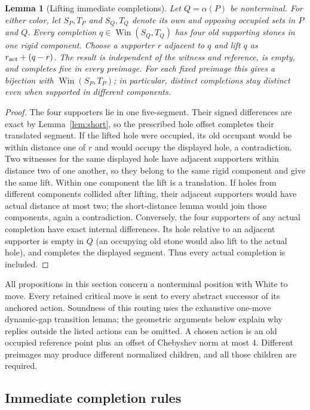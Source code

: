 \documentclass[11pt]{article}
\newtheorem{lemma}[theorem]{Lemma}
\theoremstyle{definition}
\theoremstyle{remark}
\newcommand{\A}{\alpha}
\newcommand{\Win}{\operatorname{Win}}
\begin{document}
\begin{lemma}[Lifting immediate completions]\label{mac:completion-lift}
Let $Q=\A(P)$ be nonterminal. For either color, let $S_P,T_P$
and $S_Q,T_Q$ denote its own and opposing occupied sets in $P$ and $Q$.
Every completion
$q\in\Win(S_Q,T_Q)$ has four old supporting stones in one rigid
component. Choose a supporter $r$ adjacent to $q$ and lift $q$ as
$r_{\rm act}+(q-r)$. The result is independent of the witness and
reference, is empty, and completes five in every preimage. For each
fixed preimage this gives a bijection with $\Win(S_P,T_P)$; in
particular, distinct completions stay distinct even when supported
in different components.
\end{lemma}
\begin{proof}
The four supporters lie in one five-segment. Their signed differences
are exact by Lemma~\ref{lem:short}, so the prescribed hole offset
completes their translated segment.
If the lifted hole were occupied, its old occupant would be within
distance one of $r$ and would occupy the displayed hole, a
contradiction. Two witnesses for the same displayed hole have
adjacent supporters within distance two of one another, so they
belong to the same rigid component and give the same lift.
Within one component the lift is a translation. If holes from
different components collided after lifting, their adjacent
supporters would have actual distance at most two; the short-distance
lemma would join those components, again a contradiction.
Conversely, the four supporters of any actual completion have exact
internal differences. Its hole relative to an adjacent supporter is
empty in $Q$ (an occupying old stone would also lift to the actual
hole), and completes the displayed segment. Thus every actual
completion is included.
\end{proof}

All propositions in this section concern a nonterminal position with White to move. Every retained critical move is sent to every abstract successor of its anchored action. Soundness of this routing uses the exhaustive one-move dynamic-gap transition lemma; the geometric arguments below explain why replies outside the listed actions can be omitted. A chosen action is an old occupied reference point plus an offset of Chebyshev norm at most 4. Different preimages may produce different normalized children, and all those children are required.

\subsection{Immediate completion rules}
\end{document}

